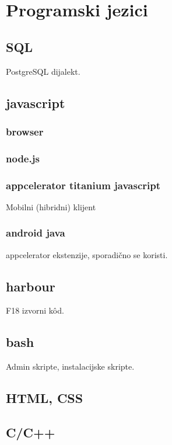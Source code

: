 \documentclass[times, utf8, seminar]{fit}
\begin{document}
\chapter{Programski jezici}

\section{SQL}

PostgreSQL dijalekt.

\section{javascript}

\subsection{browser}

\subsection{node.js}

\subsection{appcelerator titanium javascript}

Mobilni (hibridni) klijent

\subsection{android java}

appcelerator ekstenzije, sporadično se koristi.

\section{harbour}

F18 izvorni k\^od.

\section{bash}

Admin skripte, instalacijske skripte.

\section{HTML, CSS}


\section{C/C++}
\end{document}
